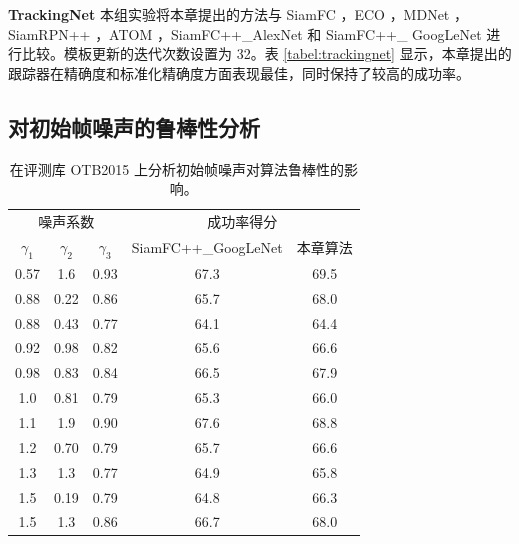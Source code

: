 \textbf{TrackingNet} 本组实验将本章提出的方法与 SiamFC \cite{SiamFC}，ECO \cite{danelljan2017eco}，MDNet \cite{MDNet}，SiamRPN++ \cite{SiamRPN++}，ATOM \cite{danelljan2019atom}，SiamFC++\_AlexNet \cite{SiamFC++} 和 SiamFC++\_
GoogLeNet \cite{SiamFC++} 进行比较。模板更新的迭代次数设置为 32。表 \ref{tabel:trackingnet} 显示，本章提出的跟踪器在精确度和标准化精确度方面表现最佳，同时保持了较高的成功率。

\subsection{对初始帧噪声的鲁棒性分析}

\begin{table}[t]
\centering
\caption{在评测库 OTB2015 上分析初始帧噪声对算法鲁棒性的影响。}
\begin{tabular}{c c c c c}
\toprule
\multicolumn{3}{c}{噪声系数} & \multicolumn{2}{c}{成功率得分} \\
\cmidrule(lr){1-3} \cmidrule(lr){4-5}
$\gamma_1$ & $\gamma_2$ & $\gamma_3$  & SiamFC++\_GoogLeNet \cite{SiamFC++} & 本章算法  \\
\midrule
0.57  &	1.6	 & 0.93	& 67.3    & 69.5 \\
0.88  & 0.22 & 0.86 & 65.7    & 68.0 \\
0.88  & 0.43 & 0.77 & 64.1    & 64.4 \\
0.92  & 0.98 & 0.82 & 65.6    & 66.6 \\
0.98  & 0.83 & 0.84 & 66.5    & 67.9 \\
1.0   & 0.81 & 0.79 & 65.3    & 66.0 \\
1.1   &	1.9  & 0.90	& 67.6    & 68.8 \\
1.2   & 0.70 & 0.79 & 65.7    & 66.6 \\
1.3   & 1.3  & 0.77 & 64.9    & 65.8 \\
1.5   & 0.19 & 0.79 & 64.8    & 66.3 \\
1.5   & 1.3  & 0.86 & 66.7    & 68.0 \\
\bottomrule
\end{tabular}
\label{table:noise}
\end{table}

